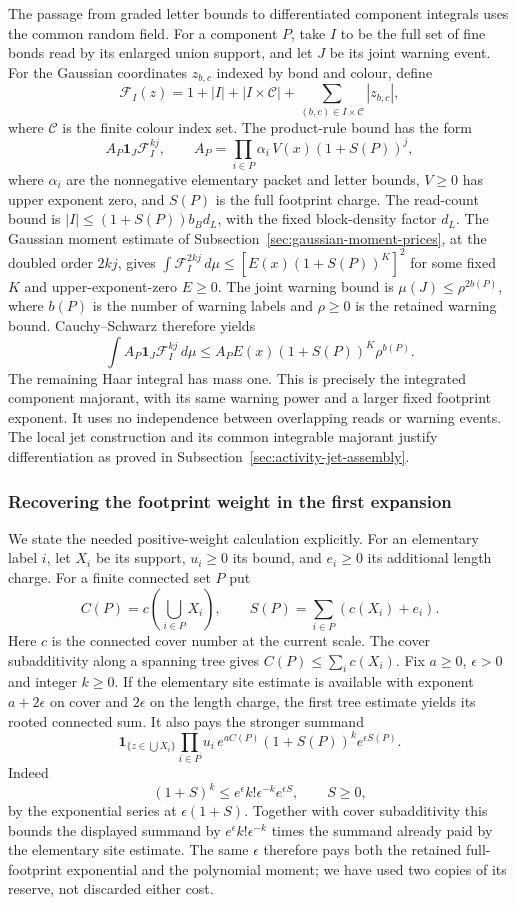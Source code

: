 The passage from graded letter bounds to differentiated component
integrals uses the common random field. For a component $P$, take
$I$ to be the full set of fine bonds read by its enlarged union
support, and let $J$ be its joint warning event. For the Gaussian
coordinates $z_{b,c}$ indexed by bond and colour, define
\[
 \mathcal F_I(z)=1+|I|+|I\times\mathcal C|
                   +\sum_{(b,c)\in I\times\mathcal C}|z_{b,c}|,
\]
where $\mathcal C$ is the finite colour index set.
The product-rule
bound has the form
\[
 A_P\mathbf1_J\mathcal F_I^{kj},
 \qquad
 A_P=\prod_{i\in P}\alpha_i\,V(x)(1+S(P))^j,
\]
where $\alpha_i$ are the nonnegative elementary packet and letter bounds,
$V\ge0$ has upper exponent zero, and $S(P)$ is the full footprint
charge. The read-count bound is
$|I|\le(1+S(P))b_B d_L$, with the fixed block-density factor $d_L$.
The Gaussian moment estimate of
Subsection~\ref{sec:gaussian-moment-prices}, at the doubled order $2kj$,
gives
$\int\mathcal F_I^{2kj}\,d\mu\le
[E(x)(1+S(P))^K]^2$
for some fixed $K$ and upper-exponent-zero $E\ge0$.
The joint warning bound is
$\mu(J)\le\rho^{2b(P)}$, where $b(P)$ is the number of warning
labels and $\rho\ge0$ is the retained warning bound. Cauchy--Schwarz
therefore yields
\[
 \int A_P\mathbf1_J\mathcal F_I^{kj}\,d\mu
 \le A_PE(x)(1+S(P))^K\rho^{b(P)}.
\]
The remaining Haar integral has mass one. This is precisely the
integrated component majorant, with its same warning power and a
larger fixed footprint exponent. It uses no independence between
overlapping reads or warning events. The local jet construction and
its common integrable majorant justify differentiation as proved in
Subsection~\ref{sec:activity-jet-assembly}.

\subsubsection{Recovering the footprint weight in the first expansion}
We state the needed positive-weight calculation explicitly. For an
elementary label $i$, let $X_i$ be its support, $u_i\ge0$ its bound,
and $e_i\ge0$ its additional length charge. For a finite connected
set $P$ put
\[
 C(P)=c\left(\bigcup_{i\in P}X_i\right),\qquad
 S(P)=\sum_{i\in P}(c(X_i)+e_i).
\]
Here $c$ is the connected cover number at the current scale. The
cover subadditivity along a spanning tree gives $C(P)\le\sum_i c(X_i)$.
Fix $a\ge0$, $\epsilon>0$ and integer $k\ge0$. If the elementary
site estimate is available with exponent $a+2\epsilon$ on cover and
$2\epsilon$ on the length charge, the first tree estimate yields
its rooted connected sum. It also pays the stronger summand
\[
 \mathbf1_{\{z\in\bigcup X_i\}}
       \prod_{i\in P}u_i\,e^{aC(P)}
                   (1+S(P))^k e^{\epsilon S(P)}.
\]
Indeed
\[
 (1+S)^k\le e^\epsilon k!\epsilon^{-k}e^{\epsilon S},
 \qquad S\ge0,
\]
by the exponential series at $\epsilon(1+S)$. Together with cover
subadditivity this bounds the displayed summand by
$e^\epsilon k!\epsilon^{-k}$ times the summand already paid by the
elementary site estimate. The same $\epsilon$ therefore pays both
the retained full-footprint exponential and the polynomial moment;
we have used two copies of its reserve, not discarded either cost.

